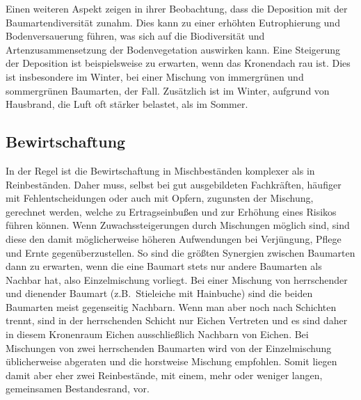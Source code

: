 \documentclass[twocolumn]{scrartcl}
\begin{document}
Einen weiteren Aspekt zeigen \cite{zhang2022MischwaldDeposition} in
ihrer Beobachtung, dass die Deposition mit der Baumartendiversität
zunahm. Dies kann zu einer erhöhten Eutrophierung und Bodenversauerung
führen, was sich auf die Biodiversität und Artenzusammensetzung der
Bodenvegetation auswirken kann. Eine Steigerung der Deposition ist beispielsweise zu erwarten, wenn das Kronendach rau ist. Dies ist insbesondere im Winter, bei einer Mischung von immergrünen und sommergrünen Baumarten, der Fall. Zusätzlich ist im Winter, aufgrund von Hausbrand, die Luft oft stärker belastet, als im Sommer.

\subsection{Bewirtschaftung}
\label{ssec:bewirtschaftung}

In der Regel ist die Bewirtschaftung in Mischbeständen komplexer als
in Reinbeständen. Daher muss, selbst bei gut ausgebildeten
Fachkräften, häufiger mit Fehlentscheidungen oder auch mit Opfern,
zugunsten der Mischung, gerechnet werden, welche zu Ertragseinbußen und
zur Erhöhung eines Risikos führen können. Wenn Zuwachssteigerungen
durch Mischungen möglich sind, sind diese den damit möglicherweise
höheren Aufwendungen bei Verjüngung, Pflege und Ernte
gegenüberzustellen. So sind die größten Synergien zwischen Baumarten
dann zu erwarten, wenn die eine Baumart stets nur andere Baumarten als
Nachbar hat, also Einzelmischung vorliegt. Bei einer Mischung von
herrschender und dienender Baumart (z.B.\ Stieleiche mit Hainbuche)
sind die beiden Baumarten meist gegenseitig Nachbarn. Wenn man aber noch nach Schichten trennt, sind in der herrschenden Schicht nur Eichen Vertreten und es sind daher in diesem Kronenraum Eichen ausschließlich Nachbarn von Eichen.
Bei Mischungen von zwei herrschenden Baumarten
wird von der Einzelmischung üblicherweise abgeraten und die
horstweise Mischung empfohlen. Somit liegen damit aber eher zwei
Reinbestände, mit einem, mehr oder weniger langen, gemeinsamen
Bestandesrand, vor.
\end{document}
